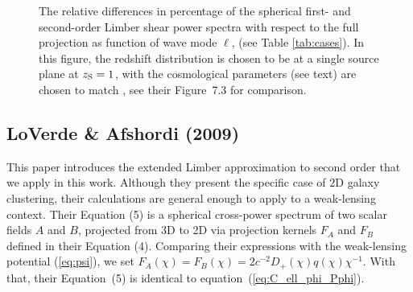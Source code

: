 \documentclass[fleqn,usenatbib]{mnras} %
\begin{document}
\begin{appendix}
\begin{figure}
  \begin{center}
  \end{center}

    \caption{The relative differences in percentage of the spherical first- and second-order Limber
    shear power spectra with respect to the full projection
    as function of wave mode $\ell$, (see Table \ref{tab:cases}). In this figure, the redshift distribution is chosen to be
    at a single source plane at $z_{\rm S}=1$, with the cosmological parameters (see text) are chosen to match
    \citet{vande2012}, see their Figure~7.3 for comparison.
    }

    \label{fig:L1L2E_Rijt}

\end{figure}



\subsection{LoVerde \& Afshordi (2009)}

This paper introduces the extended Limber approximation to second order that we
apply in this work. Although they present the specific case of 2D galaxy
clustering, their calculations are general enough to apply to a weak-lensing
context. Their Equation (5) is a spherical cross-power spectrum of two scalar
fields $A$ and $B$, projected from 3D to 2D via projection kernels $F_A$ and
$F_B$ defined in their Equation (4). Comparing their expressions with the
weak-lensing potential (\ref{eq:psi}), we set $F_A(\chi) = F_B(\chi) = 2 c^{-2}
D_+(\chi) q(\chi) \chi^{-1}$. With that, their Equation~(5) is identical to
equation~(\ref{eq:C_ell_phi_Pphi}).


\end{appendix}
\end{document}
